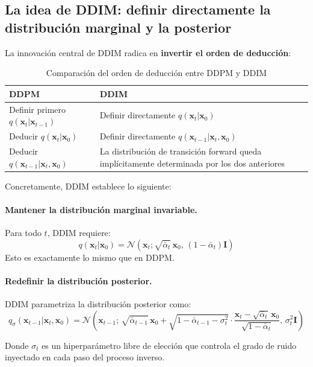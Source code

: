 \documentclass[a4paper]{article}
\begin{document}
\subsection{La idea de DDIM: definir directamente la distribución marginal y la posterior}

La innovación central de DDIM radica en \textbf{invertir el orden de deducción}:

\begin{table}[H]
\centering
\caption{Comparación del orden de deducción entre DDPM y DDIM}
\begin{tabular}{ll}
\toprule
\textbf{DDPM} & \textbf{DDIM} \\
\midrule
Definir primero $q(\mathbf{x}_t|\mathbf{x}_{t-1})$ & Definir directamente $q(\mathbf{x}_t|\mathbf{x}_0)$ \\
Deducir $q(\mathbf{x}_t|\mathbf{x}_0)$ & Definir directamente $q(\mathbf{x}_{t-1}|\mathbf{x}_t, \mathbf{x}_0)$ \\
Deducir $q(\mathbf{x}_{t-1}|\mathbf{x}_t, \mathbf{x}_0)$ & La distribución de transición forward queda implícitamente determinada por los dos anteriores \\
\bottomrule
\end{tabular}
\end{table}

Concretamente, DDIM establece lo siguiente:

\paragraph{Mantener la distribución marginal invariable.} Para todo $t$, DDIM requiere:
$$
q(\mathbf{x}_t | \mathbf{x}_0) = \mathcal{N}(\mathbf{x}_t; \sqrt{\bar{\alpha}_t}\,\mathbf{x}_0,\, (1-\bar{\alpha}_t)\mathbf{I})
$$
Esto es exactamente lo mismo que en DDPM.

\paragraph{Redefinir la distribución posterior.} DDIM parametriza la distribución posterior como:
$$
q_\sigma(\mathbf{x}_{t-1} | \mathbf{x}_t, \mathbf{x}_0) = \mathcal{N}\left(\mathbf{x}_{t-1};\, \sqrt{\bar{\alpha}_{t-1}}\,\mathbf{x}_0 + \sqrt{1-\bar{\alpha}_{t-1}-\sigma_t^2}\cdot\frac{\mathbf{x}_t - \sqrt{\bar{\alpha}_t}\,\mathbf{x}_0}{\sqrt{1-\bar{\alpha}_t}},\, \sigma_t^2\mathbf{I}\right)
$$

Donde $\sigma_t$ es un hiperparámetro libre de elección que controla el grado de ruido inyectado en cada paso del proceso inverso.
\end{document}
